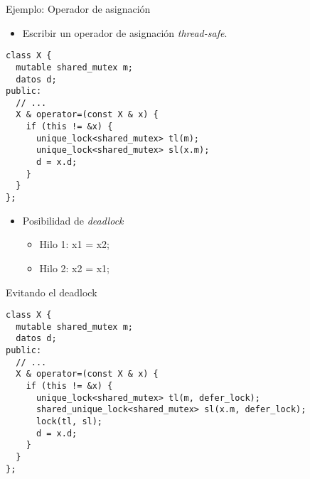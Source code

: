 \begin{frame}[fragile]{Ejemplo: Operador de asignación}
\begin{itemize}
  \item Escribir un operador de asignación \emph{thread-safe}.
\end{itemize}
\begin{lstlisting}
class X {
  mutable shared_mutex m;
  datos d;
public:
  // ...
  X & operator=(const X & x) {
    if (this != &x) {
      unique_lock<shared_mutex> tl(m);
      unique_lock<shared_mutex> sl(x.m);
      d = x.d;
    }
  }
};
\end{lstlisting}
\begin{itemize}
  \item Posibilidad de \emph{deadlock}
    \begin{itemize}
      \item Hilo 1: x1 = x2;
      \item Hilo 2: x2 = x1;
    \end{itemize}
\end{itemize}
\end{frame}

\begin{frame}[fragile]{Evitando el deadlock}
\begin{lstlisting}
class X {
  mutable shared_mutex m;
  datos d;
public:
  // ...
  X & operator=(const X & x) {
    if (this != &x) {
      unique_lock<shared_mutex> tl(m, defer_lock);
      shared_unique_lock<shared_mutex> sl(x.m, defer_lock);
      lock(tl, sl);
      d = x.d;
    }
  }
};
\end{lstlisting}
\end{frame}
